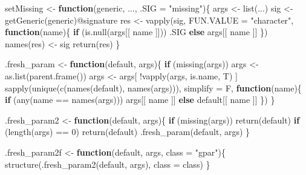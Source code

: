 \documentclass[
]{article}
\newenvironment{Shaded}{\begin{snugshade}}{\end{snugshade}}
\newcommand{\AttributeTok}[1]{\textcolor[rgb]{0.77,0.63,0.00}{#1}}
\newcommand{\ControlFlowTok}[1]{\textcolor[rgb]{0.13,0.29,0.53}{\textbf{#1}}}
\newcommand{\DecValTok}[1]{\textcolor[rgb]{0.00,0.00,0.81}{#1}}
\newcommand{\FunctionTok}[1]{\textcolor[rgb]{0.00,0.00,0.00}{#1}}
\newcommand{\NormalTok}[1]{#1}
\newcommand{\OtherTok}[1]{\textcolor[rgb]{0.56,0.35,0.01}{#1}}
\newcommand{\SpecialCharTok}[1]{\textcolor[rgb]{0.00,0.00,0.00}{#1}}
\newcommand{\StringTok}[1]{\textcolor[rgb]{0.31,0.60,0.02}{#1}}
\begin{document}
\begin{Shaded}
\begin{Highlighting}[]
\NormalTok{setMissing }\OtherTok{\textless{}{-}} 
  \ControlFlowTok{function}\NormalTok{(generic, ..., }\AttributeTok{.SIG =} \StringTok{"missing"}\NormalTok{)\{}
\NormalTok{    args }\OtherTok{\textless{}{-}} \FunctionTok{list}\NormalTok{(...)}
\NormalTok{    sig }\OtherTok{\textless{}{-}} \FunctionTok{getGeneric}\NormalTok{(generic)}\SpecialCharTok{@}\NormalTok{signature}
\NormalTok{    res }\OtherTok{\textless{}{-}} \FunctionTok{vapply}\NormalTok{(sig, }\AttributeTok{FUN.VALUE =} \StringTok{"character"}\NormalTok{,}
      \ControlFlowTok{function}\NormalTok{(name)\{}
        \ControlFlowTok{if}\NormalTok{ (}\FunctionTok{is.null}\NormalTok{(args[[ name ]]))}
\NormalTok{          .SIG}
        \ControlFlowTok{else}
\NormalTok{          args[[ name ]]}
\NormalTok{      \})}
    \FunctionTok{names}\NormalTok{(res) }\OtherTok{\textless{}{-}}\NormalTok{ sig}
    \FunctionTok{return}\NormalTok{(res)}
\NormalTok{  \}}

\NormalTok{.fresh\_param }\OtherTok{\textless{}{-}} 
  \ControlFlowTok{function}\NormalTok{(default, args)\{}
    \ControlFlowTok{if}\NormalTok{ (}\FunctionTok{missing}\NormalTok{(args))}
\NormalTok{      args }\OtherTok{\textless{}{-}} \FunctionTok{as.list}\NormalTok{(}\FunctionTok{parent.frame}\NormalTok{())}
\NormalTok{    args }\OtherTok{\textless{}{-}}\NormalTok{ args[ }\SpecialCharTok{!}\FunctionTok{vapply}\NormalTok{(args, is.name, T) ]}
    \FunctionTok{sapply}\NormalTok{(}\FunctionTok{unique}\NormalTok{(}\FunctionTok{c}\NormalTok{(}\FunctionTok{names}\NormalTok{(default), }\FunctionTok{names}\NormalTok{(args))),}
      \AttributeTok{simplify =}\NormalTok{ F,}
      \ControlFlowTok{function}\NormalTok{(name)\{}
        \ControlFlowTok{if}\NormalTok{ (}\FunctionTok{any}\NormalTok{(name }\SpecialCharTok{==} \FunctionTok{names}\NormalTok{(args)))}
\NormalTok{          args[[ name ]]}
        \ControlFlowTok{else}
\NormalTok{          default[[ name ]]}
\NormalTok{      \})}
\NormalTok{  \}}

\NormalTok{.fresh\_param2 }\OtherTok{\textless{}{-}} 
  \ControlFlowTok{function}\NormalTok{(default, args)\{}
    \ControlFlowTok{if}\NormalTok{ (}\FunctionTok{missing}\NormalTok{(args))}
      \FunctionTok{return}\NormalTok{(default)}
    \ControlFlowTok{if}\NormalTok{ (}\FunctionTok{length}\NormalTok{(args) }\SpecialCharTok{==} \DecValTok{0}\NormalTok{)}
      \FunctionTok{return}\NormalTok{(default)}
    \FunctionTok{.fresh\_param}\NormalTok{(default, args)}
\NormalTok{  \}}

\NormalTok{.fresh\_param2f }\OtherTok{\textless{}{-}} 
  \ControlFlowTok{function}\NormalTok{(default, args, }\AttributeTok{class =} \StringTok{"gpar"}\NormalTok{)\{}
    \FunctionTok{structure}\NormalTok{(}\FunctionTok{.fresh\_param2}\NormalTok{(default, args), }\AttributeTok{class =}\NormalTok{ class)}
\NormalTok{  \}}


\end{Highlighting}
\end{Shaded}
\end{document}
